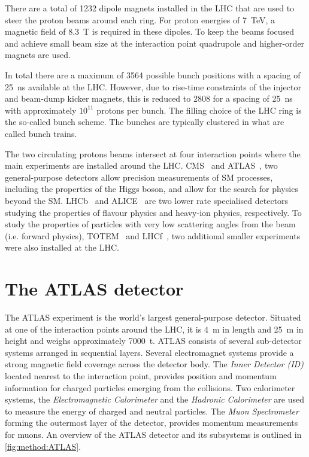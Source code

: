There are a total of 1232 dipole magnets installed in the LHC that are used to steer the proton beams around each ring. For proton energies of \SI{7}{\tera\eV}, a magnetic field of \SI{8.3}{\tesla} is required in these dipoles. To keep the beams focused and achieve small beam size at the 
interaction point quadrupole and higher-order magnets are used. 

In total there are a maximum of 3564 possible bunch positions with a spacing of \SI{25}{\nano\second} available at the LHC. However, due to rise-time constraints of the injector and beam-dump kicker magnets, this is reduced to 2808 for a spacing of \SI{25}{\nano\second} with approximately $10^{11}$ protons per bunch. The filling choice of the LHC ring is the so-called bunch scheme. The bunches are typically clustered in what are called bunch trains.

The two circulating protons beams intersect at four interaction points where the main experiments are installed around the LHC. CMS~\cite{CMS} and ATLAS~\cite{ATLAS}, two general-purpose detectors allow precision measurements of SM processes, including the properties of the Higgs boson, and allow for the search for physics beyond the SM. LHCb~\cite{LHCb} and ALICE~\cite{ALICE} are two lower rate specialised detectors studying the properties of flavour physics and heavy-ion physics, respectively. To study the properties of particles with very low scattering angles from the beam (i.e. forward physics), TOTEM~\cite{totem:2008zza} and LHCf~\cite{LHCf:2008zz}, two additional smaller experiments were also installed at the LHC.

\section{The ATLAS detector}\label{sec:method:ATLAS}

The ATLAS experiment is the world's largest general-purpose detector. Situated at one of the interaction points around the LHC, it is \SI{4}{\meter} in length and \SI{25}{\meter} in height and weighs approximately \SI{7000}{\tonne}. ATLAS consists of several sub-detector systems arranged in sequential layers. Several electromagnet systems provide a strong magnetic field coverage across the detector body. The \emph{Inner Detector (ID)} located nearest to the interaction point, provides position and momentum information for charged particles emerging from the collisions. Two calorimeter systems, the \emph{Electromagnetic Calorimeter} and the \emph{Hadronic Calorimeter} are used to measure the energy of charged and neutral particles. The \emph{Muon Spectrometer} forming the outermost layer of the detector, provides momentum measurements for muons. An overview of the ATLAS detector and its subsystems is outlined in \cref{fig:method:ATLAS}.

